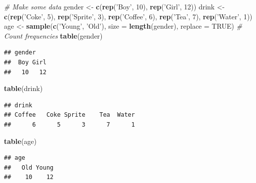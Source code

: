 \documentclass[]{book}
\newenvironment{Shaded}{\begin{snugshade}}{\end{snugshade}}
\newcommand{\KeywordTok}[1]{\textcolor[rgb]{0.13,0.29,0.53}{\textbf{#1}}}
\newcommand{\DataTypeTok}[1]{\textcolor[rgb]{0.13,0.29,0.53}{#1}}
\newcommand{\DecValTok}[1]{\textcolor[rgb]{0.00,0.00,0.81}{#1}}
\newcommand{\StringTok}[1]{\textcolor[rgb]{0.31,0.60,0.02}{#1}}
\newcommand{\CommentTok}[1]{\textcolor[rgb]{0.56,0.35,0.01}{\textit{#1}}}
\newcommand{\OtherTok}[1]{\textcolor[rgb]{0.56,0.35,0.01}{#1}}
\newcommand{\NormalTok}[1]{#1}
\theoremstyle{definition}
\theoremstyle{definition}
\theoremstyle{definition}
\theoremstyle{remark}
\begin{document}
\begin{Shaded}
\begin{Highlighting}[]
\CommentTok{# Make some data}
\NormalTok{gender <-}\StringTok{ }\KeywordTok{c}\NormalTok{(}\KeywordTok{rep}\NormalTok{(}\StringTok{'Boy'}\NormalTok{, }\DecValTok{10}\NormalTok{), }\KeywordTok{rep}\NormalTok{(}\StringTok{'Girl'}\NormalTok{, }\DecValTok{12}\NormalTok{))}
\NormalTok{drink <-}\StringTok{ }\KeywordTok{c}\NormalTok{(}\KeywordTok{rep}\NormalTok{(}\StringTok{'Coke'}\NormalTok{, }\DecValTok{5}\NormalTok{), }\KeywordTok{rep}\NormalTok{(}\StringTok{'Sprite'}\NormalTok{, }\DecValTok{3}\NormalTok{), }\KeywordTok{rep}\NormalTok{(}\StringTok{'Coffee'}\NormalTok{, }\DecValTok{6}\NormalTok{), }\KeywordTok{rep}\NormalTok{(}\StringTok{'Tea'}\NormalTok{, }\DecValTok{7}\NormalTok{), }\KeywordTok{rep}\NormalTok{(}\StringTok{'Water'}\NormalTok{, }\DecValTok{1}\NormalTok{))  }
\NormalTok{age <-}\StringTok{  }\KeywordTok{sample}\NormalTok{(}\KeywordTok{c}\NormalTok{(}\StringTok{'Young'}\NormalTok{, }\StringTok{'Old'}\NormalTok{), }\DataTypeTok{size =} \KeywordTok{length}\NormalTok{(gender), }\DataTypeTok{replace =} \OtherTok{TRUE}\NormalTok{)}
\CommentTok{# Count frequencies}
\KeywordTok{table}\NormalTok{(gender)}
\end{Highlighting}
\end{Shaded}

\begin{verbatim}
## gender
##  Boy Girl 
##   10   12
\end{verbatim}

\begin{Shaded}
\begin{Highlighting}[]
\KeywordTok{table}\NormalTok{(drink)}
\end{Highlighting}
\end{Shaded}

\begin{verbatim}
## drink
## Coffee   Coke Sprite    Tea  Water 
##      6      5      3      7      1
\end{verbatim}

\begin{Shaded}
\begin{Highlighting}[]
\KeywordTok{table}\NormalTok{(age)}
\end{Highlighting}
\end{Shaded}

\begin{verbatim}
## age
##   Old Young 
##    10    12
\end{verbatim}
\end{document}
